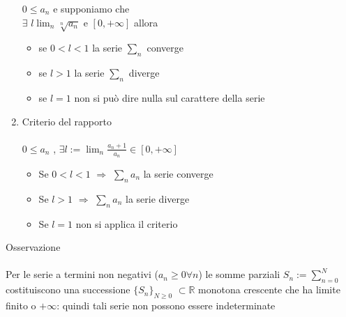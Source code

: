 \documentclass{article}
\begin{document}
\begin{enumerate}
    \(0\le a_n\) e supponiamo che \\
    \(\exists\) \( l \lim_n  \sqrt[n]{a_n}\) e \([0,+\infty]\) allora\\
    \begin{itemize}
        \item se \(0<l<1\) la serie \(\sum_n\) converge
        \item se \(l>1\) la serie \(\sum_n\) diverge
        \item se \(l=1\) non si può dire nulla sul carattere della serie
    \end{itemize}
    \item Criterio del rapporto\\\\
    \(0\le a_n\) , \(\exists l:=\lim_n \frac{a_n+1}{a_n} \in [0,+\infty]\)\\
    \begin{itemize}
        \item Se \(0<l<1\) \(\Rightarrow\)  \(\sum_n a_n \) la serie converge
        \item Se \(l>1\) \(\Rightarrow\)  \(\sum_n a_n \) la serie diverge
        \item Se \(l=1\) non si applica il criterio
    \end{itemize}
\end{enumerate} 
{\large Osservazione}\\\\
Per le serie a termini non negativi (\(a_n\ge 0 \forall n\)) le somme parziali \(S_n:=\sum^N_{n=0}\) costituiscono una successione \(\{S_n\}_{N\ge0}\) \(\subset \mathbb{R}\) monotona crescente che ha limite finito o \(+\infty\): quindi tali serie non possono essere indeterminate\\\\\\
\end{document}
